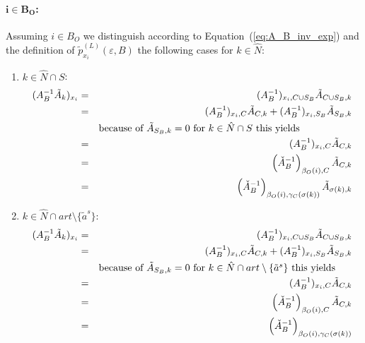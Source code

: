 \documentclass[a4paper]{article}
\begin{document}
\paragraph{$\mathbf{i \in B_{O}}$:}
Assuming $i \in B_{O}$ we distinguish
according to Equation~(\ref{eq:A_B_inv_exp})
and the definition of $\tilde{p}_{x_{i}}^{(L)}(\varepsilon, B)$ the
following cases for $k \in \hat{N}$:
\begin{enumerate}
\item $k \in \hat{N} \cap S$:
\begin{eqnarray}
 (A_{B}^{-1}\tilde{A}_{k})_{x_{i}} &=&
  (A_{B}^{-1})_{x_{i}, C \cup S_{B}}\tilde{A}_{C \cup S_{B}, k}
  \nonumber \\
  &=&
  (A_{B}^{-1})_{x_{i}, C}\tilde{A}_{C, k} +
  (A_{B}^{-1})_{x_{i}, S_{B}}\tilde{A}_{S_{B}, k} 
  \nonumber \\
  &&\begin{minipage}{9cm}
    because of $\tilde{A}_{S_{B},k}=0$ for $k \in \hat{N} \cap S$ this yields
  \end{minipage}
  \nonumber \\
  &=&  
  (A_{B}^{-1})_{x_{i}, C}\tilde{A}_{C, k} 
  \nonumber \\
  &=&
  \left(\check{A}_{B}^{-1}\right)_{\beta_{O}(i),C}\tilde{A}_{C, k}
  \nonumber \\
  &=&
  \left(\check{A}_{B}^{-1}\right)_{\beta_{O}(i), \gamma_{C}(\sigma(k))}
  \tilde{A}_{\sigma(k), k}
\end{eqnarray}
\item $k \in \hat{N} \cap art \setminus \{\tilde{a}^{s}\}$:
\begin{eqnarray}
  (A_{B}^{-1}\tilde{A}_{k})_{x_{i}} &=&
  (A_{B}^{-1})_{x_{i}, C \cup S_{B}}\tilde{A}_{C \cup S_{B}, k}
  \nonumber \\
  &=&
  (A_{B}^{-1})_{x_{i}, C}\tilde{A}_{C, k} +
  (A_{B}^{-1})_{x_{i}, S_{B}}\tilde{A}_{S_{B}, k} 
  \nonumber \\
  &&\begin{minipage}{9cm}
    because of $\tilde{A}_{S_{B},k}=0$ for
    $k \in \hat{N} \cap art \setminus \{\tilde{a}^{s}\}$ this yields
  \end{minipage}
  \nonumber \\   
  &=&
  (A_{B}^{-1})_{x_{i}, C}\tilde{A}_{C, k} 
  \nonumber \\ 
  &=&
  \left(\check{A}_{B}^{-1}\right)_{\beta_{O}(i), C}\tilde{A}_{C, k}
  \nonumber \\
  &=&
  \left(\check{A}_{B}^{-1}\right)_{\beta_{O}(i), \gamma_{C}(\sigma(k))}

\end{eqnarray}
\end{enumerate}
\end{document}
